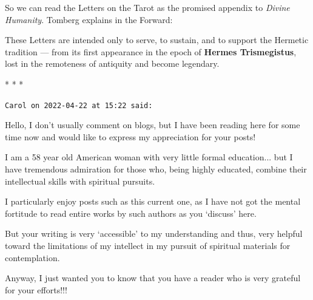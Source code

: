 So we can read the Letters on the Tarot as the promised appendix to \emph{Divine Humanity}. Tomberg explains in the Forward:


\begin{quotex}
These Letters are intended only to serve, to sustain, and to support the Hermetic tradition --- from its first appearance in the epoch of \textbf{Hermes Trismegistus}, lost in the remoteness of antiquity and become legendary.
\end{quotex}




\begin{center}* * *\end{center}

\begin{footnotesize}
\begin{sffamily}

\texttt{Carol on 2022-04-22 at 15:22 said:}

Hello, I don't usually comment on blogs, but I have been reading here for some time now and would like to express my appreciation for your posts!

I am a 58 year old American woman with very little formal education... but I have tremendous admiration for those who, being highly educated, combine their intellectual skills with spiritual pursuits.

I particularly enjoy posts such as this current one, as I have not got the mental fortitude to read entire works by such authors as you `discuss' here.

But your writing is very `accessible' to my understanding and thus, very helpful toward the limitations of my intellect in my pursuit of spiritual materials for contemplation.

Anyway, I just wanted you to know that you have a reader who is very grateful for your efforts!!!

\hfill

\end{sffamily}
\end{footnotesize}

